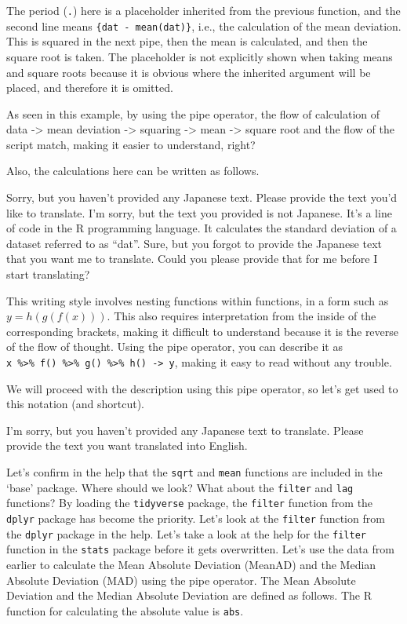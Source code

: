 \documentclass[
  a4paper,
]{book}
\begin{document}
The period (\texttt{.}) here is a placeholder inherited from the
previous function, and the second line means
\texttt{\{dat\ -\ mean(dat)\}}, i.e., the calculation of the mean
deviation. This is squared in the next pipe, then the mean is
calculated, and then the square root is taken. The placeholder is not
explicitly shown when taking means and square roots because it is
obvious where the inherited argument will be placed, and therefore it is
omitted.

As seen in this example, by using the pipe operator, the flow of
calculation of data -\textgreater{} mean deviation -\textgreater{}
squaring -\textgreater{} mean -\textgreater{} square root and the flow
of the script match, making it easier to understand, right?

Also, the calculations here can be written as follows.

Sorry, but you haven't provided any Japanese text. Please provide the
text you'd like to translate. I'm sorry, but the text you provided is
not Japanese. It's a line of code in the R programming language. It
calculates the standard deviation of a dataset referred to as ``dat''.
Sure, but you forgot to provide the Japanese text that you want me to
translate. Could you please provide that for me before I start
translating?

This writing style involves nesting functions within functions, in a
form such as \(y = h(g(f(x)))\). This also requires interpretation from
the inside of the corresponding brackets, making it difficult to
understand because it is the reverse of the flow of thought. Using the
pipe operator, you can describe it as
\texttt{x\ \%\textgreater{}\%\ f()\ \%\textgreater{}\%\ g()\ \%\textgreater{}\%\ h()\ -\textgreater{}\ y},
making it easy to read without any trouble.

We will proceed with the description using this pipe operator, so let's
get used to this notation (and shortcut).

I'm sorry, but you haven't provided any Japanese text to translate.
Please provide the text you want translated into English.

Let's confirm in the help that the \texttt{sqrt} and \texttt{mean}
functions are included in the `base' package. Where should we look? What
about the \texttt{filter} and \texttt{lag} functions? By loading the
\texttt{tidyverse} package, the \texttt{filter} function from the
\texttt{dplyr} package has become the priority. Let's look at the
\texttt{filter} function from the \texttt{dplyr} package in the help.
Let's take a look at the help for the \texttt{filter} function in the
\texttt{stats} package before it gets overwritten. Let's use the data
from earlier to calculate the Mean Absolute Deviation (MeanAD) and the
Median Absolute Deviation (MAD) using the pipe operator. The Mean
Absolute Deviation and the Median Absolute Deviation are defined as
follows. The R function for calculating the absolute value is
\texttt{abs}.
\end{document}
